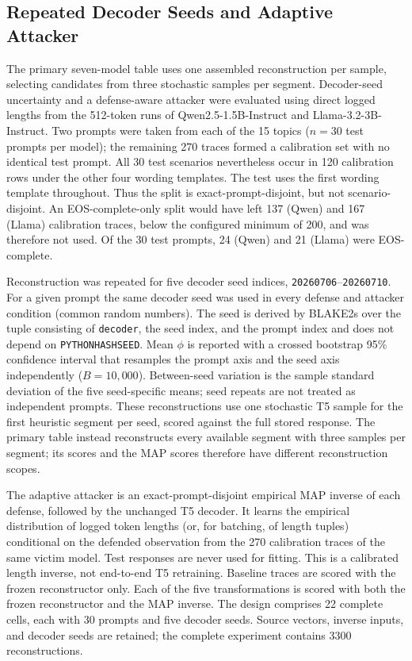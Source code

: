 \documentclass[electronics,article,submit,pdftex,moreauthors]{Definitions/mdpi}
\begin{document}
\subsection{Repeated Decoder Seeds and Adaptive Attacker}\label{sec:robustness-methods}
The primary seven-model table uses one assembled reconstruction per sample, selecting candidates from three stochastic samples per segment. Decoder-seed uncertainty and a defense-aware attacker were evaluated using direct logged lengths from the 512-token runs of Qwen2.5-1.5B-Instruct and Llama-3.2-3B-Instruct. Two prompts were taken from each of the 15 topics ($n=30$ test prompts per model); the remaining 270 traces formed a calibration set with no identical test prompt. All 30 test scenarios nevertheless occur in 120 calibration rows under the other four wording templates. The test uses the first wording template throughout. Thus the split is exact-prompt-disjoint, but not scenario-disjoint. An EOS-complete-only split would have left 137 (Qwen) and 167 (Llama) calibration traces, below the configured minimum of 200, and was therefore not used. Of the 30 test prompts, 24 (Qwen) and 21 (Llama) were EOS-complete.

Reconstruction was repeated for five decoder seed indices, \texttt{20260706}--\texttt{20260710}. For a given prompt the same decoder seed was used in every defense and attacker condition (common random numbers). The seed is derived by BLAKE2s over the tuple consisting of \texttt{decoder}, the seed index, and the prompt index and does not depend on \texttt{PYTHONHASHSEED}. Mean $\phi$ is reported with a crossed bootstrap 95\% confidence interval that resamples the prompt axis and the seed axis independently ($B=10{,}000$). Between-seed variation is the sample standard deviation of the five seed-specific means; seed repeats are not treated as independent prompts. These reconstructions use one stochastic T5 sample for the first heuristic segment per seed, scored against the full stored response. The primary table instead reconstructs every available segment with three samples per segment; its scores and the MAP scores therefore have different reconstruction scopes.

The adaptive attacker is an exact-prompt-disjoint empirical MAP inverse of each defense, followed by the unchanged T5 decoder. It learns the empirical distribution of logged token lengths (or, for batching, of length tuples) conditional on the defended observation from the 270 calibration traces of the same victim model. Test responses are never used for fitting. This is a calibrated length inverse, not end-to-end T5 retraining. Baseline traces are scored with the frozen reconstructor only. Each of the five transformations is scored with both the frozen reconstructor and the MAP inverse. The design comprises 22 complete cells, each with 30 prompts and five decoder seeds. Source vectors, inverse inputs, and decoder seeds are retained; the complete experiment contains 3300 reconstructions.
\end{document}
